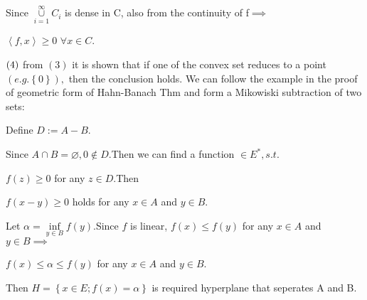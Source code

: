 \documentclass{article}
\begin{document}
Since $\underset{i=1}{\overset{\infty }{\cup }}C_{i}$ is dense in C, also
from the continuity of f$\implies $

$\left\langle f,x\right\rangle \geq 0$ $\forall x\in C.$

$\bigskip \left( 4\right) $ from $\left( 3\right) $ it is shown that if one
of the convex set reduces to a point $\left( e.g.\left\{ 0\right\} \right) ,$
then the conclusion holds. We can follow the example in the proof of
geometric form of Hahn-Banach Thm and form a Mikowiski subtraction of two
sets:

Define $D:=A-B.$

Since $A\cap B=\varnothing ,0\notin D.$Then we can find a function $\in
E^{\ast },s.t.$

$f\left( z\right) \geq 0$ for any $z\in D.$Then

$f\left( x-y\right) \geq 0$ holds for any $x\in A$ and $y\in B.$

Let $\alpha =\underset{y\in B}{\inf }f\left( y\right) .$Since $f$ is linear, 
$f\left( x\right) \leq f\left( y\right) $ for any $x\in A$ and $y\in
B\implies $

$f\left( x\right) \leq \alpha \leq f\left( y\right) $ for any $x\in A$ and $%
y\in B$.

Then $H=\left\{ x\in E;f\left( x\right) =\alpha \right\} $ is required
hyperplane that seperates A and B.
\end{document}
